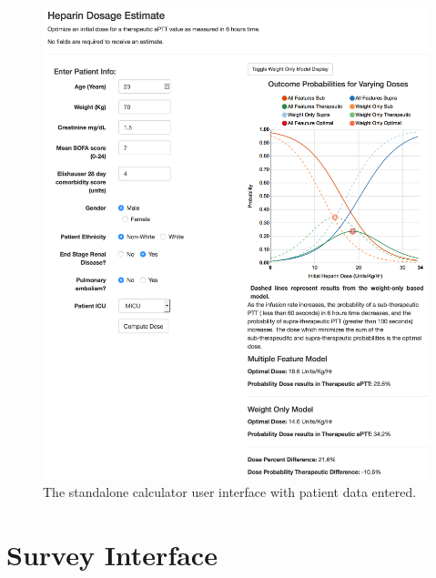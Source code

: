 \documentclass[12pt,a4paper,]{report}
\begin{document}
\begin{figure}[H]
\noindent
\includegraphics[width=1\textwidth]{source/figures/calc_full.png}
\caption{\label{fig:calc_full}The standalone calculator user interface with patient data entered.}
\end{figure}

\section{Survey Interface}\label{survey-interface}
\end{document}
